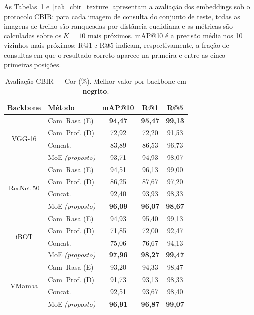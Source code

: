\documentclass[letterpaper, 10 pt, conference]{ieeeconf}
\begin{document}
As Tabelas~\ref{tab_cbir_color} e~\ref{tab_cbir_texture} apresentam a
avaliação dos embeddings sob o protocolo CBIR: para cada imagem de consulta
do conjunto de teste, todas as imagens de treino são ranqueadas por
distância euclidiana e as métricas são calculadas sobre os $K\!=\!10$
mais próximos.
mAP@10 é a precisão média nos 10 vizinhos mais próximos; R@1 e R@5
indicam, respectivamente, a fração de consultas em que o resultado correto
aparece na primeira e entre as cinco primeiras posições.

\begin{table}[htbp]
\caption{Avaliação CBIR --- Cor (\%). Melhor valor por backbone em
         \textbf{negrito}.}
\begin{center}
\begin{tabular}{c|l|c|c|c}
\hline
\textbf{Backbone} & \textbf{Método} & \textbf{mAP@10}
                  & \textbf{R@1} & \textbf{R@5} \\
\hline
\multirow{4}{*}{VGG-16}
  & Cam. Rasa (E)           & \textbf{94,47} & \textbf{95,47} & \textbf{99,13} \\
  & Cam. Prof. (D)          & 72,92 & 72,20 & 91,53 \\
  & Concat.                 & 83,89 & 86,53 & 96,73 \\
  & MoE \textit{(proposto)} & 93,71 & 94,93 & 98,07 \\
\hline
\multirow{4}{*}{ResNet-50}
  & Cam. Rasa (E)           & 94,51 & 96,13 & 99,00 \\
  & Cam. Prof. (D)          & 86,25 & 87,67 & 97,20 \\
  & Concat.                 & 92,40 & 93,93 & 98,33 \\
  & MoE \textit{(proposto)} & \textbf{96,09} & \textbf{96,07} & \textbf{98,67} \\
\hline
\multirow{4}{*}{iBOT}
  & Cam. Rasa (E)           & 94,93 & 95,40 & 99,13 \\
  & Cam. Prof. (D)          & 71,85 & 72,00 & 92,47 \\
  & Concat.                 & 75,06 & 76,67 & 94,13 \\
  & MoE \textit{(proposto)} & \textbf{97,96} & \textbf{98,27} & \textbf{99,47} \\
\hline
\multirow{4}{*}{VMamba}
  & Cam. Rasa (E)           & 93,20 & 94,33 & 98,47 \\
  & Cam. Prof. (D)          & 91,73 & 93,13 & 98,33 \\
  & Concat.                 & 92,51 & 93,67 & 98,40 \\
  & MoE \textit{(proposto)} & \textbf{96,91} & \textbf{96,87} & \textbf{99,07} \\
\hline
\end{tabular}
\label{tab_cbir_color}
\end{center}
\end{table}
\end{document}

